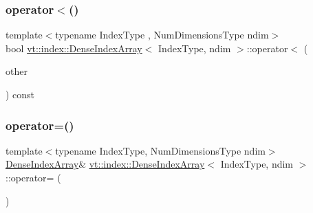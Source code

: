 \mbox{\label{structvt_1_1index_1_1_dense_index_array_a7d1d02c9c0a50822d63afeb3358a7a0f}} 
\subsubsection{\texorpdfstring{operator$<$()}{operator<()}}
{\footnotesize\ttfamily template$<$typename Index\+Type , Num\+Dimensions\+Type ndim$>$ \\
bool \hyperlink{structvt_1_1index_1_1_dense_index_array}{vt\+::index\+::\+Dense\+Index\+Array}$<$ Index\+Type, ndim $>$\+::operator$<$ (\begin{DoxyParamCaption}\item[{\hyperlink{structvt_1_1index_1_1_dense_index_array_aec95c4ed1b4071d31d24142f02429dbd}{Dense\+Index\+Array\+Type} const \&}]{other }\end{DoxyParamCaption}) const}

\mbox{\label{structvt_1_1index_1_1_dense_index_array_a5f8e772873b44f670de731fe087e3a5a}} 
\subsubsection{\texorpdfstring{operator=()}{operator=()}}
{\footnotesize\ttfamily template$<$typename Index\+Type, Num\+Dimensions\+Type ndim$>$ \\
\hyperlink{structvt_1_1index_1_1_dense_index_array}{Dense\+Index\+Array}\& \hyperlink{structvt_1_1index_1_1_dense_index_array}{vt\+::index\+::\+Dense\+Index\+Array}$<$ Index\+Type, ndim $>$\+::operator= (\begin{DoxyParamCaption}\item[{\hyperlink{structvt_1_1index_1_1_dense_index_array}{Dense\+Index\+Array}$<$ Index\+Type, ndim $>$ const \&}]{ }\end{DoxyParamCaption})\hspace{0.3cm}{\ttfamily [default]}}

\mbox{\label{structvt_1_1index_1_1_dense_index_array_aa407d7e96709099c4a7ee179c65c627f}} 
